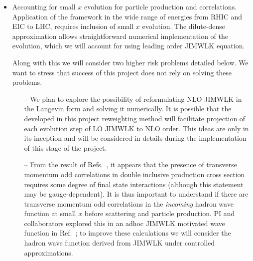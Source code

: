 \begin{itemize}
			\item Accounting for small $x$ evolution for particle production and correlations. 
				Application of the framework in the wide range of energies from RHIC and EIC to LHC, requires 
				inclusion of small $x$ evolution. The dilute-dense approximation allows straightforward 
				numerical implementation  of the evolution, which we will account for using leading order 
				JIMWLK equation. 

				Along with this we will consider two higher risk problems detailed below. 
				We want to stress that success of this project does not rely on solving these problems. 
				\begin{itemize}
					\item[--]
				We  plan to explore the possibility of reformulating NLO JIMWLK in the Langevin form and 
				solving it numerically. It is possible that the developed in this project reweighting method 
				will facilitate projection of each evolution step of LO JIMWLK to NLO order. This ideas are only 
				in its inception and will be considered in details during the implementation of this stage of the project.
					\item[--]
				From the result of Refs.~\cite{McLerran:2016snu,Kovchegov:2018jun}, it appears that 
				the presence of transverse momentum odd correlations in double inclusive production cross section 
				requires some degree of final state interactions (although 
				this statement may be gauge-dependent). It is thus important to understand if there
				are transverse momentum odd correlations in the {\it incoming} hadron wave function at small $x$
				before scattering and particle production. PI and collaborators  explored  this in an adhoc  JIMWLK motivated 
				wave function in Ref.~\cite{Kovner:2016jfp}; to improve  these calculations  we will consider 
				the hadron wave function derived from JIMWLK under controlled approximations.  
				\end{itemize}
			

\end{itemize}
